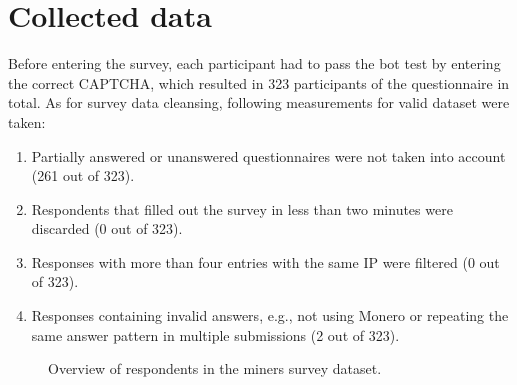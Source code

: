 \documentclass[
  printed, %
  table,   %
  lof,     %
  lot,     %
           oneside, color
]{fithesis3}
\begin{document}
\section{Collected data}
Before entering the survey, each participant had to pass the bot test by entering the correct CAPTCHA, which resulted in 323 participants of the questionnaire in total. As for survey data cleansing, following measurements for valid dataset were taken:
\begin{enumerate}
\item Partially answered or unanswered questionnaires were not taken into account (261 out of 323). 
\item Respondents that filled out the survey in less than two minutes were discarded (0 out of 323).
\newpage
\item Responses with more than four entries with the same IP were filtered (0 out of 323).
\item Responses containing invalid answers, e.g., not using Monero or repeating the same answer pattern in multiple submissions (2 out of 323).
\end{enumerate}
\vspace{-2em}
\begin{center}
\begin{figure}[H]
\caption{Overview of respondents in the miners survey dataset.}
\label{chart:price}\end{figure}\end{center}
\end{document}
